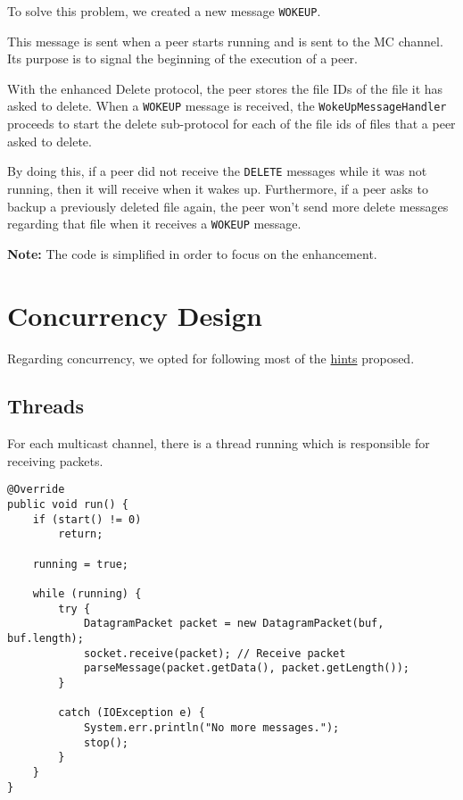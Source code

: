 \documentclass[11pt]{report}
\begin{document}
To solve this problem, we created a new message \texttt{WOKEUP}. 

This message is sent when a peer starts running and is sent to the MC channel. Its purpose is to signal the beginning of the execution of a peer.

With the enhanced Delete protocol, the peer stores the file IDs of the file it has asked to delete. When a \texttt{WOKEUP} message is received, the \texttt{WokeUpMessageHandler} proceeds to start the delete sub-protocol for each of the file ids of files that a peer asked to delete. 

By doing this, if a peer did not receive the \texttt{DELETE} messages while it was not running, then it will receive when it wakes up. Furthermore, if a peer asks to backup a previously deleted file again, the peer won't send more delete messages regarding that file when it receives a \texttt{WOKEUP} message. \newline

\textbf{Note:} The code is simplified in order to focus on the enhancement.

\chapter{Concurrency Design}

Regarding concurrency, we opted for following most of the \href{https://web.fe.up.pt/~pfs/aulas/sd2021/projs/proj1/concurrency_hints.html}{hints} proposed.

\section{Threads}

For each multicast channel, there is a thread running which is responsible for receiving packets.  

\begin{verbatim}
@Override
public void run() {
    if (start() != 0)
        return;

    running = true;

    while (running) {
        try {
            DatagramPacket packet = new DatagramPacket(buf, buf.length);
            socket.receive(packet); // Receive packet
            parseMessage(packet.getData(), packet.getLength());
        }

        catch (IOException e) {
            System.err.println("No more messages.");
            stop();
        }
    }
}
\end{verbatim}
\end{document}

